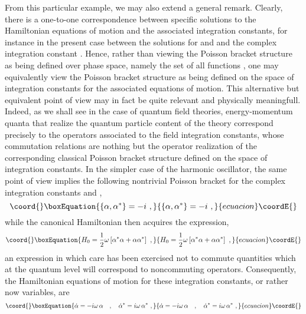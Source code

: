 \documentclass[a4paper,11pt]{article}
\begin{document}
From this particular example, we may also extend a general remark.
Clearly, there is a one-to-one correspondence between specific solutions
to the Hamiltonian equations of motion and the associated integration constants,
for instance in the present case between the solutions for \coordHE{} and \coordHE{}
and the complex integration constant \myHighlight{$\alpha$}\coordHE{}. Hence, rather than
viewing the Poisson bracket structure as being defined over phase space, 
namely the set of all functions \coordHE{}, one may equivalently view 
the Poisson bracket structure as being defined on the space of integration
constants for the associated equations of motion. This alternative but
equivalent point of view may in fact be quite relevant and physically
meaningfull. Indeed, as we shall see in the case of quantum field theories,
energy-momentum quanta that realize the quantum particle content of the
theory correspond precisely to the operators associated to the field
integration constants, whose commutation relations are nothing but the
operator realization of the corresponding classical Poisson bracket
structure defined on the space of integration constants. In the simpler
case of the harmonic oscillator, the same point of view implies the
following nontrivial Poisson bracket for the complex integration constants
\myHighlight{$\alpha$}\coordHE{} and \myHighlight{$\alpha^*$}\coordHE{},
\begin{equation}\coord{}\boxEquation{
\{\alpha,\alpha^*\}=-i\ ,
}{
\{\alpha,\alpha^*\}=-i\ ,
}{ecuacion}\coordE{}\end{equation}
while the canonical Hamiltonian then acquires the expression,
\begin{equation}\coord{}\boxEquation{
H_0=\frac{1}{2}\omega\left[\alpha^*\alpha+\alpha\alpha^*\right]\ ,
}{
H_0=\frac{1}{2}\omega\left[\alpha^*\alpha+\alpha\alpha^*\right]\ ,
}{ecuacion}\coordE{}\end{equation}
an expression in which care has been exercised not to commute quantities
which at the quantum level will correspond to noncommuting operators.
Consequently, the Hamiltonian equations of motion for these integration
constants, or rather now variables, are
\begin{equation}\coord{}\boxEquation{
\dot{\alpha}=-i\omega\,\alpha\ \ \ ,\ \ \ 
\dot{\alpha}^*=i\omega\,\alpha^*\ ,
}{
\dot{\alpha}=-i\omega\,\alpha\ \ \ ,\ \ \ 
\dot{\alpha}^*=i\omega\,\alpha^*\ ,
}{ecuacion}\coordE{}\end{equation}
\end{document}
